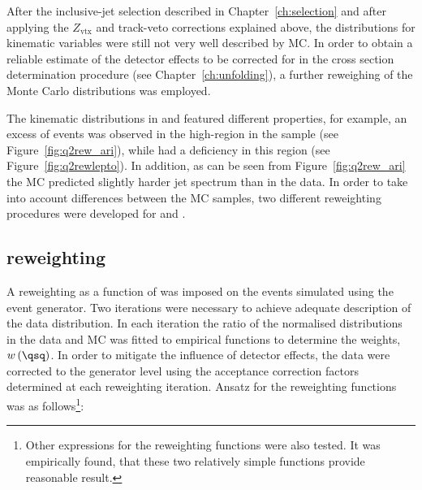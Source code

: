 After the inclusive-jet selection described in Chapter~\ref{ch:selection} and after applying the $Z_\text{vtx}$ and track-veto corrections explained above, the distributions for kinematic variables were still not very well described by MC. In order to obtain a reliable estimate of the detector effects to be corrected for in the cross section determination procedure (see Chapter~\ref{ch:unfolding}), a further reweighing of the Monte Carlo distributions was employed. 

The kinematic distributions in \lepto and \ariadne featured different properties, for example, an excess of events was observed in the high-\qsq region in the \ariadne sample (see Figure~\ref{fig:q2rew_ari}), while \lepto had a deficiency in this region (see Figure~\ref{fig:q2rewlepto}). In addition, as can be seen from Figure~\ref{fig:q2rew_ari} the \ariadne MC predicted slightly harder jet spectrum than in the data. In order to take into account differences between the MC samples, two different reweighting procedures were developed for \lepto and \ariadne.

\subsection{\lepto reweighting}
A reweighting as a function of \qsq was imposed on the events simulated using the \lepto event generator. Two iterations were necessary to achieve adequate description of the data distribution. In each iteration the ratio of the normalised \qsq distributions in the data and MC was fitted to empirical functions to determine the weights, $w\left( \qsq\right) $. In order to mitigate the influence of detector effects, the data were corrected to the generator level using the acceptance correction factors determined at each reweighting iteration. Ansatz for the reweighting functions was as follows\footnote{Other expressions for the reweighting functions were also tested. It was empirically found, that these two relatively simple functions provide reasonable result.}:

